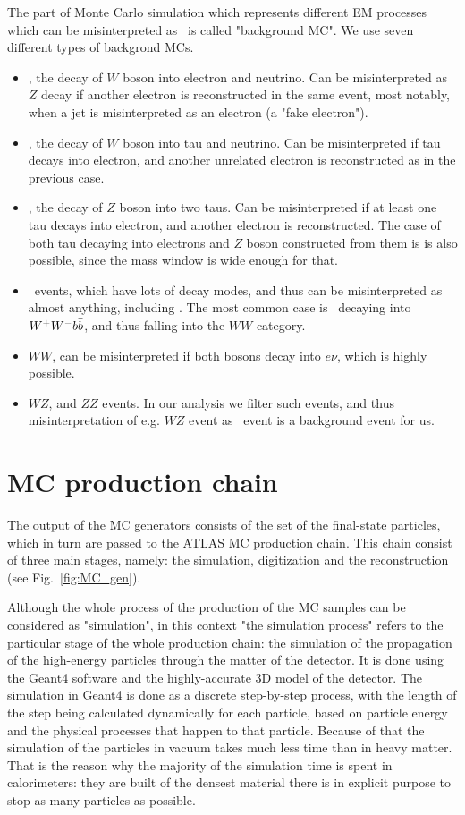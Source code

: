 The part of Monte Carlo simulation which represents different EM processes which can be misinterpreted as \Zee\ is called "background MC". We use seven different types of backgrond MCs.
\begin{itemize}
\item \Wenu, the decay of $W$ boson into electron and neutrino. Can be misinterpreted as $Z$ decay if another electron is reconstructed in the same event, most notably, when a jet is misinterpreted as an electron (a "fake electron").
\item \Wtau, the decay of $W$ boson into tau and neutrino. Can be misinterpreted if tau decays into electron, and another unrelated electron is reconstructed as in the previous case.
\item \Ztau, the decay of $Z$ boson into two taus. Can be misinterpreted if at least one tau decays into electron, and another electron is reconstructed. The case of both tau decaying into electrons and $Z$ boson constructed from them is is also possible, since the mass window is wide enough for that.
\item \ttbar\ events, which have lots of decay modes, and thus can be misinterpreted as almost anything, including \Zee. The most common case is \ttbar\ decaying into $W^{+}W^{-}b\bar{b}$, and thus falling into the $WW$ category.
\item $WW$, can be misinterpreted if both bosons decay into $e\nu$, which is highly possible.
\item $WZ$, and $ZZ$ events. In our analysis we filter such events, and thus misinterpretation of e.g. $WZ$ event as \Zee\ event is a background event for us.
\end{itemize}

\section{MC production chain}
\label{sec:MC_sim_rec}

The output of the MC generators consists of the set of the final-state particles, which in turn are passed to the ATLAS MC production chain. This chain consist of three main stages, namely: the simulation, digitization and the reconstruction (see Fig.~\ref{fig:MC_gen}).

Although the whole process of the production of the MC samples can be considered as "simulation", in this context "the simulation process" refers to the particular stage of the whole production chain: the simulation of the propagation of the high-energy particles through the matter of the detector. It is done using the Geant4 software and the highly-accurate 3D model of the detector. The simulation in Geant4 is done as a discrete step-by-step process, with the length of the step being calculated dynamically for each particle, based on particle energy and the physical processes that happen to that particle. Because of that the simulation of the particles in vacuum takes much less time than in heavy matter. That is the reason why the majority of the simulation time is spent in calorimeters: they are built of the densest material there is in explicit purpose to stop as many particles as possible.

